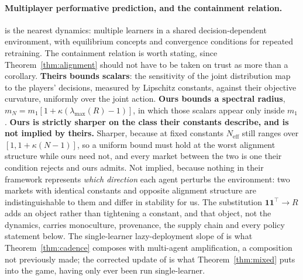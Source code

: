 \documentclass{article}
\theoremstyle{plain}
\theoremstyle{definition}
\newcommand{\Neff}{N_{\mathrm{eff}}}
\newcommand{\mN}{m_N}
\newcommand{\lmax}{\lambda_{\max}}
\begin{document}
\paragraph{Multiplayer performative prediction, and the containment relation.}
\citet{narang2023} is the nearest dynamics: multiple learners in a shared decision-dependent environment, with equilibrium concepts and convergence conditions for repeated retraining. The containment relation is worth stating, since Theorem~\ref{thm:alignment} should not have to be taken on trust as more than a corollary. \textbf{Theirs bounds scalars}: the sensitivity of the joint distribution map to the players' decisions, measured by Lipschitz constants, against their objective curvature, uniformly over the joint action. \textbf{Ours bounds a spectral radius}, $\mN = m_1[1+\kappa(\lmax(R)-1)]$, in which those scalars appear only inside $m_1$. \textbf{Ours is strictly sharper on the class their constants describe, and is not implied by theirs.} Sharper, because at fixed constants $\Neff$ still ranges over $[1,1+\kappa(N-1)]$, so a uniform bound must hold at the worst alignment structure while ours need not, and every market between the two is one their condition rejects and ours admits. Not implied, because nothing in their framework represents \emph{which direction} each agent perturbs the environment: two markets with identical constants and opposite alignment structure are indistinguishable to them and differ in stability for us. The substitution $\mathbf{1}\mathbf{1}^{\top}\!\to R$ adds an object rather than tightening a constant, and that object, not the dynamics, carries monoculture, provenance, the supply chain and every policy statement below. The single-learner lazy-deployment slope of \citet{mendlerdunner2020} is what Theorem~\ref{thm:cadence} composes with multi-agent amplification, a composition not previously made; the corrected update of \citet{izzo2021} is what Theorem~\ref{thm:mixed} puts into the game, having only ever been run single-learner.
\end{document}

